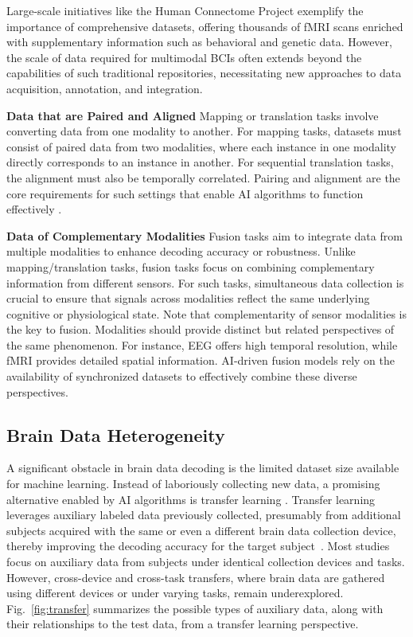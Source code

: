 \documentclass[journal]{IEEEtran}
\begin{document}
Large-scale initiatives like the Human Connectome Project \cite{VanEssen2012, Glasser2013} exemplify the importance of comprehensive datasets, offering thousands of fMRI scans enriched with supplementary information such as behavioral and genetic data. However, the scale of data required for multimodal BCIs often extends beyond the capabilities of such traditional repositories, necessitating new approaches to data acquisition, annotation, and integration.

\textbf{Data that are Paired and Aligned} Mapping or translation tasks involve converting data from one modality to another. For mapping tasks, datasets must consist of paired data from two modalities, where each instance in one modality directly corresponds to an instance in another. For sequential translation tasks, the alignment must also be temporally correlated. Pairing and alignment are the core requirements for such settings that enable AI algorithms to function effectively \cite{Sato2024}.

\textbf{Data of Complementary Modalities} Fusion tasks aim to integrate data from multiple modalities to enhance decoding accuracy or robustness. Unlike mapping/translation tasks, fusion tasks focus on combining complementary information from different sensors. For such tasks, simultaneous data collection is crucial to ensure that signals across modalities reflect the same underlying cognitive or physiological state. Note that complementarity of sensor modalities is the key to fusion. Modalities should provide distinct but related perspectives of the same phenomenon. For instance, EEG offers high temporal resolution, while fMRI provides detailed spatial information. AI-driven fusion models rely on the availability of synchronized datasets to effectively combine these diverse perspectives.

\subsection{Brain Data Heterogeneity} \label{sect:heterogeneity}

A significant obstacle in brain data decoding is the limited dataset size available for machine learning. Instead of laboriously collecting new data, a promising alternative enabled by AI algorithms is transfer learning \cite{Pan2010, Zhuang2021}. Transfer learning leverages auxiliary labeled data previously collected, presumably from additional subjects acquired with the same or even a different brain data collection device, thereby improving the decoding accuracy for the target subject~\cite{Wu2022a, Wu2022}. Most studies focus on auxiliary data from subjects under identical collection devices and tasks. However, cross-device and cross-task transfers, where brain data are gathered using different devices or under varying tasks, remain underexplored. Fig.~\ref{fig:transfer} summarizes the possible types of auxiliary data, along with their relationships to the test data, from a transfer learning perspective.
\end{document}
